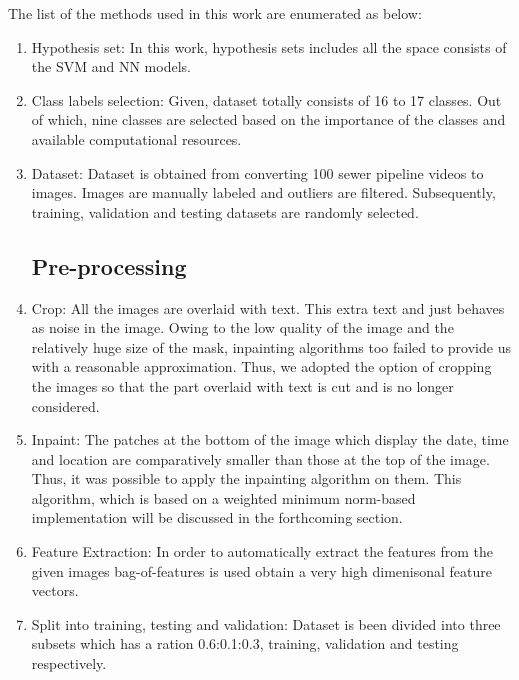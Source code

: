 \documentclass[letterpaper,12pt, onecolumn]{article}%
\begin{document}
The list of the methods used in this work are enumerated as below:
\begin{enumerate}
\subsection*{Model}
  \item Hypothesis set: In this work, hypothesis sets includes all the space consists of the SVM and NN models.
  
  \item Class labels selection: Given, dataset totally consists of 16 to 17 classes. Out of which, nine classes are selected based on the importance of the classes and available computational resources.
  
  \item Dataset:  Dataset is obtained from converting 100 sewer pipeline videos to images. Images are manually labeled and outliers are filtered. Subsequently, training, validation and testing datasets are randomly selected.
  
  \subsection*{Pre-processing}
  \item Crop: All the images are overlaid with text. This extra text and just behaves as noise in the image. Owing to the low quality of the image and the relatively huge size of the mask, inpainting algorithms too failed to provide us with a reasonable approximation. Thus, we adopted the option of cropping the images so that the part overlaid with text is cut and is no longer considered. 
  
  \item Inpaint: The patches at the bottom of the image which display the date, time and location are comparatively smaller than those at the top of the image. Thus, it was possible to apply the inpainting algorithm on them. This algorithm, which is based on a weighted minimum norm-based implementation will be discussed in the forthcoming section.
  
  \item Feature Extraction: In order to automatically extract the features from the given images bag-of-features \citep{csurka2004visual} is used obtain a very high dimenisonal feature vectors.
  
  \item Split into training, testing and validation: Dataset is been divided into three subsets which has a ration 0.6:0.1:0.3, training, validation and testing respectively.
  

\end{enumerate}
\end{document}
